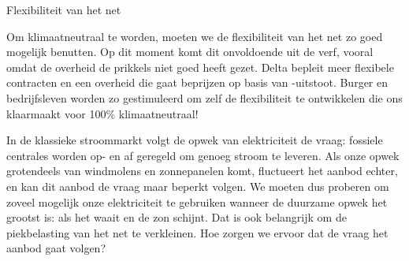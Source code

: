 \begin{voorstel}{Flexibiliteit van het net}

\begin{samenvatting}
Om klimaatneutraal te worden, moeten we de flexibiliteit van het net zo goed mogelijk benutten. Op dit moment komt dit onvoldoende uit de verf, vooral omdat de overheid de prikkels niet goed heeft gezet. Delta bepleit meer flexibele contracten en een overheid die gaat beprijzen op basis van \COO-uitstoot. Burger en bedrijfsleven worden zo gestimuleerd om zelf de flexibiliteit te ontwikkelen die ons klaarmaakt voor 100\% klimaatneutraal!
\end{samenvatting}

\begin{multicols}{2}

\begin{uitdaging}
In de klassieke stroommarkt volgt de opwek van elektriciteit de vraag: fossiele centrales worden op- en af geregeld om genoeg stroom te leveren. Als onze opwek grotendeels van windmolens en zonnepanelen komt, fluctueert het aanbod echter, en kan dit aanbod de vraag maar beperkt volgen. We moeten dus proberen om zoveel mogelijk onze elektriciteit te gebruiken wanneer de duurzame opwek het grootst is: als het waait en de zon schijnt. Dat is ook belangrijk om de piekbelasting van het net te verkleinen. Hoe zorgen we ervoor dat de vraag het aanbod gaat volgen?
\end{uitdaging}

\begin{overwegingen}


\end{overwegingen}
\end{multicols}
\end{voorstel}
